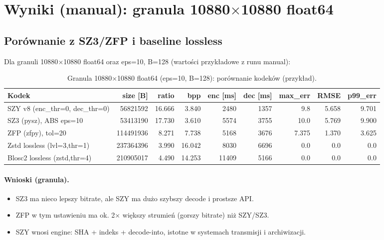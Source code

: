 \documentclass[11pt,a4paper]{article}
\begin{document}
\section{Wyniki (manual): granula 10880$\times$10880 float64}

\subsection{Porównanie z SZ3/ZFP i baseline lossless}
Dla granuli 10880$\times$10880 float64 oraz eps=10, B=128 (wartości przykładowe z runu manual):

\begin{table}[H]
\centering
\caption{Granula 10880$\times$10880 float64 (eps=10, B=128): porównanie kodeków (przykład).}
\begin{adjustbox}{max width=\textwidth}
\begin{tabular}{@{}lrrrrrrrr@{}}
\toprule
Kodek & size [B] & ratio & bpp & enc [ms] & dec [ms] & max\_err & RMSE & p99\_err \\
\midrule
SZY v8 (enc\_thr=0, dec\_thr=0) & 56821592 & 16.666 & 3.840 & 2480 & 1357 & 9.8 & 5.658 & 9.701 \\
SZ3 (pysz), ABS eps=10         & 53413190 & 17.730 & 3.610 & 5574 & 3755 & 10.0 & 5.769 & 9.900 \\
ZFP (zfpy), tol=20             &114491936 &  8.271 & 7.738 & 5168 & 3676 & 7.375 & 1.370 & 3.625 \\
Zstd lossless (lvl=3,thr=1)    &237364396 &  3.990 &16.042 & 8030 & 6696 & 0.0 & 0.0 & 0.0 \\
Blosc2 lossless (zstd,thr=4)   &210905017 &  4.490 &14.253 &11409 & 5166 & 0.0 & 0.0 & 0.0 \\
\bottomrule
\end{tabular}
\end{adjustbox}
\end{table}

\paragraph{Wnioski (granula).}
\begin{itemize}
  \item SZ3 ma nieco lepszy bitrate, ale SZY ma dużo szybszy decode i prostsze API.
  \item ZFP w tym ustawieniu ma ok. 2$\times$ większy strumień (gorszy bitrate) niż SZY/SZ3.
  \item SZY wnosi engine: SHA + indeks + decode-into, istotne w systemach transmisji i archiwizacji.
\end{itemize}
\end{document}
